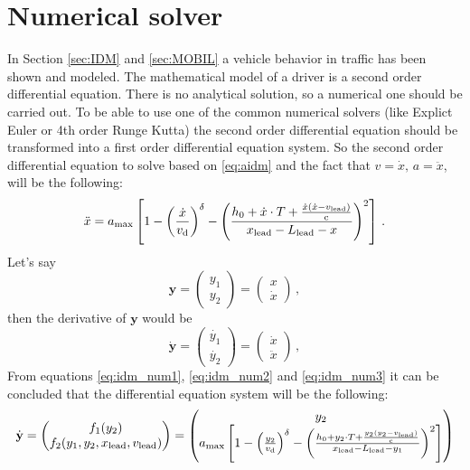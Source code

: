 		\section{Numerical solver}
			In Section \ref{sec:IDM} and \ref{sec:MOBIL} a vehicle behavior in traffic has been shown and modeled. The mathematical model of a driver is a second order differential equation. There is no analytical solution, so a numerical one should be carried out. To be able to use one of the common numerical solvers (like Explict Euler or 4th order Runge Kutta) the second order differential equation should be transformed into a first order differential equation system. So the second order differential equation to solve based on \ref{eq:aidm} and the fact that $v=\dot{x},\,a=\ddot{x}$, will be the following:
			\begin{equation}
				\ddot{x}=a_{\rm max}\left [ 1 - \left ( \frac{\dot{x}}{{v_{\rm d}}} \right )^\delta - \left ( \frac{h_0 + \dot{x}\cdot T + \frac{\dot{x}(\dot{x}-v_{\rm lead})}{{\rm c}}}{x_{\rm lead}-L_{\rm lead} - x} \right )^2 \right ]\,.
				\label{eq:idm_num1}
			\end{equation}
			Let's say
			\begin{equation}
				\textbf{y}=
				\begin{pmatrix}
					y_1\\
					y_2
				\end{pmatrix}
				=
				\begin{pmatrix}
					x\\
					\dot{x}
				\end{pmatrix}\,,
				\label{eq:idm_num2}
			\end{equation}
			then the derivative of $\textbf{y}$ would be
			\begin{equation}
				\dot{\textbf{y}}=
				\begin{pmatrix}
					\dot{y_1}\\
					\dot{y_2}
				\end{pmatrix}
				=
				\begin{pmatrix}
					\dot{x}\\
					\ddot{x}
				\end{pmatrix}\,,
				\label{eq:idm_num3}
			\end{equation}
			From equations \ref{eq:idm_num1}, \ref{eq:idm_num2} and \ref{eq:idm_num3} it can be concluded that the differential equation system will be the following:
			\begin{equation}
				\dot{\textbf{y}}
				=
				\begin{pmatrix}
					f_1(y_2)\\
					f_2(y_1,y_2,x_{\rm lead},v_{\rm lead})\\
				\end{pmatrix}
				=
				\begin{pmatrix}
					y_2\\
					a_{\rm max}\left [ 1 - \left ( \frac{y_2}{{v_{\rm d}}} \right )^{\delta} - \left ( \frac{h_0 + y_2\cdot T + \frac{y_2(y_2-v_{\rm lead})}{{\rm c}}}{x_{\rm lead} - L_{\rm lead} - y_1} \right )^2 \right ]
				\end{pmatrix}
				\label{eq:numerical_idm}
			\end{equation}